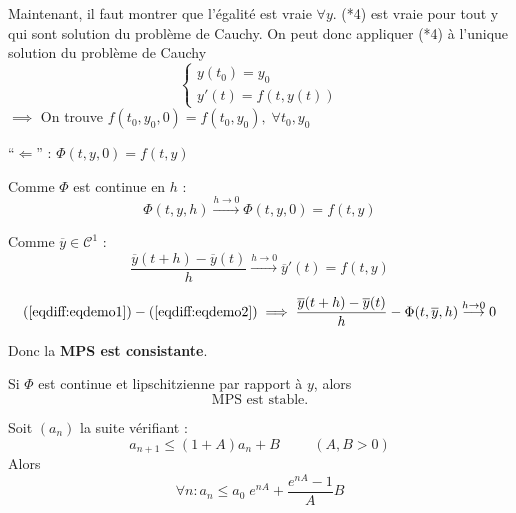 \begin{preuve}
        Maintenant, il faut montrer que l'égalité est vraie $\forall y$. (*4) est vraie pour
        tout y qui sont solution du problème de Cauchy. On peut donc appliquer (*4) à
        l'unique solution du problème de Cauchy 
        \[
            \left\lbrace
            \begin{array}{c}
                y(t_0) = y_0 \\
                y'(t) = f(t,y(t))
            \end{array}\right.
        \]
        $\implies$ On trouve $f(t_0,y_0,0) = f(t_0,y_0), \; \forall t_0,y_0$

        \vspace{1.3cm}
        ``$\Longleftarrow$'' :
        $\Phi(t,y,0) = f(t,y)$

        Comme $\Phi$ est continue en $h$ :
        \begin{equation}
            \Phi(t,y,h) \overset{h\to0}{\longrightarrow} \Phi(t,y,0) = f(t,y)
            \label{eqdiff:eqdemo1}
        \end{equation}

        Comme $\overline{y} \in \mathcal{C}^1$ :
        \begin{equation}
            \frac{\overline{y}(t+h) - \overline{y}(t)}{h} \overset{h\to0}{\longrightarrow}
            \overline{y}'(t) = f(t,y)
            \label{eqdiff:eqdemo2} 
        \end{equation}

        \[
            (\ref{eqdiff:eqdemo1}) - (\ref{eqdiff:eqdemo2}) \implies
            \frac{\overline{y}(t+h) - \overline{y}(t)}{h} - \Phi(t,\overline{y},h)
            \overset{h\to0}{\longrightarrow} 0
        \]

    Donc la \textbf{MPS est consistante}.

\end{preuve}

\begin{prop}
    Si $\Phi$ est continue et lipschitzienne par rapport à $y$, alors
    \[
        \text{MPS est stable.}
    \]
\end{prop}

\begin{lemme}
    Soit $(a_n)$ la suite vérifiant :
    \[
        a_{n+1} \leq (1+A)a_n + B \hspace{1cm}(A,B > 0)
    \]
    Alors 
    \[
        \forall n : a_n \leq a_0 \; e^{nA} + \frac{e^{nA} - 1}{A}B
    \]
\end{lemme}

